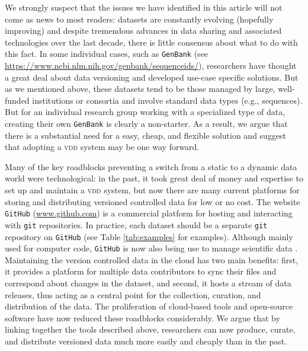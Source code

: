 \documentclass[a4paper,11pt]{article}
\newcommand{\smurl}[1]{{\footnotesize\url{#1}}}
\begin{document}
We strongly suspect that the issues we have identified in this article will not come as news to most readers: datasets are constantly evolving (hopefully improving) and despite tremendous advances in data sharing and associated technologies over the last decade, there is little consensus about what to do with this fact. In some individual cases, such as \texttt{GenBank} (see \url{https://www.ncbi.nlm.nih.gov/genbank/sequenceids/}), researchers have thought a great deal about data versioning and developed use-case specific solutions. But as we mentioned above, these datasets tend to be those managed by large, well-funded institutions or consortia and involve standard data types (e.g., sequences). But for an individual research group working with a specialized type of data, creating their own \texttt{GenBank} is clearly a non-starter. As a result, we argue that there is a substantial need for a easy, cheap, and flexible solution and suggest that adopting a \textsc{vdd} system may be one way forward.


Many of the key roadblocks preventing a switch from a static to a dynamic data world were technological: in the past, it took great deal of money and expertise to set up and maintain a \textsc{vdd} system, but now there are many current platforms for storing and distributing versioned controlled data for low or no cost.  The website \texttt{GitHub} (\smurl{www.github.com}) is a commercial platform for hosting and interacting with \texttt{git} repositories. In practice, each dataset should be a separate \texttt{git} repository on \texttt{GitHub} (see Table \ref{tab:examples} for examples). Although mainly used for computer code, \texttt{GitHub} is now also being use to manage scientific data \citep{Perkel-2016}. Maintaining the version controlled data in the cloud has two main benefits: first, it provides a platform for multiple data contributors to sync their files and correspond about changes in the dataset, and second, it hosts a stream of data releases, thus acting as a central point for  the collection, curation, and distribution of the data.  The proliferation of cloud-based tools and open-source software have now reduced these roadblocks considerably.  We argue that by linking together the tools described above, researchers can now produce, curate, and distribute versioned data much more easily and cheaply than in the past.

\end{document}
